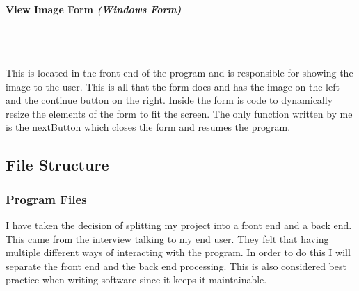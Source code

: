 \begin{FlushLeft}
    \bk

    \paragraph{View Image Form \textit{(Windows Form)}} \mbox{} \\

    \begin{figure}[H]
        \centering
    \end{figure}\\

    This is located in the front end of the program and is responsible for showing the image to the user. This is all that the form does and has the image on the left and the continue button on the right. Inside the form is code to dynamically resize the elements of the form to fit the screen. The only function written by me is the nextButton which closes the form and resumes the program.

    \BK

    \subsection{File Structure}
    \subsubsection{Program Files}
    I have taken the decision of splitting my project into a front end and a back end. This came from the interview talking to my end user. They felt that having multiple different ways of interacting with the program. In order to do this I will separate the front end and the back end processing. This is also considered best practice when writing software since it keeps it maintainable. \\ \bk
    

\end{FlushLeft}
